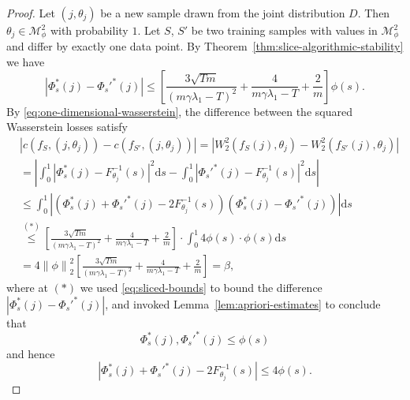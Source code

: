 \documentclass[letterpaper]{article} %
\begin{document}
\begin{proof}
  Let $\left( j,\theta_j \right)$ be a new sample drawn from the joint distribution $D$. Then $\theta_j\in\mathcal{M}_{\phi}^2$ with probability $1$. Let $S$, $S'$ be two training samples with values in $\mathcal{M}_{\phi}^2$ and differ by exactly one data point. By Theorem~\ref{thm:slice-algorithmic-stability} we have
  \begin{equation}
    \label{eq:sliced-bounds}
    \left| \Phi_s^{*} \left( j \right) -\Phi_s'^{*} \left( j \right) \right| \leq \left[\frac{3\sqrt{Tm}}{\left( m\gamma\lambda_1-T \right)^2}+\frac{4}{m\gamma\lambda_1-T}+\frac{2}{m}\right]\phi \left( s \right).
  \end{equation}
  By \eqref{eq:one-dimensional-wasserstein}, the difference between the squared Wasserstein losses satisfy
  \begin{equation*}
    \begin{aligned}
      &\left| c \left( f_S, \left( j,\theta_j \right) \right) - c \left( f_{S'}, \left( j,\theta_j \right) \right) \right|=\left| W_2^2 \left( f_S \left( j \right),\theta_j \right) - W_2^2 \left( f_{S'} \left( j \right),\theta_j \right) \right|\\
      &=\left| \int_0^1 \left| \Phi_s^{*} \left( j \right)-F_{\theta_j}^{-1}\left( s \right) \right|^2\mathrm{d}s - \int_0^1 \left| \Phi_s'^{*} \left( j \right)-F_{\theta_j}^{-1}\left( s \right) \right|^2\mathrm{d}s \right|\\
      &\leq \int_0^1 \left| \left( \Phi_s^{*} \left( j \right)+\Phi_s'^{*} \left( j \right)-2F_{\theta_j}^{-1}\left( s \right) \right)\left( \Phi_s^{*} \left( j \right) -\Phi_s'^{*} \left( j \right) \right) \right| \mathrm{d}s\\
      &\stackrel{\left( * \right)}{\leq} \left[\frac{3\sqrt{Tm}}{\left( m\gamma\lambda_1-T \right)^2}+\frac{4}{m\gamma\lambda_1-T}+\frac{2}{m}\right]\cdot \int_0^1 4\phi \left( s \right)\cdot \phi \left( s \right)\mathrm{d}s\\
      &=4\left\| \phi \right\|_2^2\left[\frac{3\sqrt{Tm}}{\left( m\gamma\lambda_1-T \right)^2}+\frac{4}{m\gamma\lambda_1-T}+\frac{2}{m}\right]=\beta,
    \end{aligned}
  \end{equation*}
  where at $\left( * \right)$ we used \eqref{eq:sliced-bounds} to bound the difference $\left| \Phi_s^{*} \left( j \right) -\Phi_s'^{*} \left( j \right) \right|$, and invoked Lemma~\ref{lem:apriori-estimates} to conclude that
  \begin{equation*}
    \Phi_s^{*}\left( j \right),\Phi_s'^{*}\left( j \right) \leq \phi \left( s \right)
  \end{equation*}
  and hence
  \begin{equation*}
    \left| \Phi_s^{*} \left( j \right)+\Phi_s'^{*} \left( j \right)-2F_{\theta_j}^{-1}\left( s \right) \right|\leq 4\phi \left( s \right).
  \end{equation*}
\end{proof}
\end{document}
